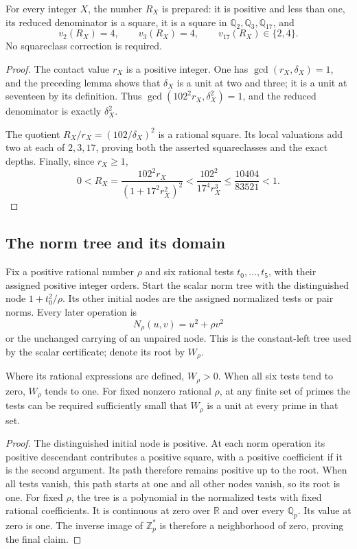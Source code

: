 \begin{proposition}\label{sn:prepared-constant}
For every integer $X$, the number $R_X$ is prepared: it is
positive and less than one, its reduced denominator is a square,
it is a square in $\mathbb Q_2,\mathbb Q_3,\mathbb Q_{17}$,
and
\[
 v_2(R_X)=4,\qquad v_3(R_X)=4,\qquad
 v_{17}(R_X)\in\{2,4\}.
\]
No squareclass correction is required.
\end{proposition}
\begin{proof}
The contact value $r_X$ is a positive integer.  One has
$\gcd(r_X,\delta_X)=1$, and the preceding lemma shows that
$\delta_X$ is a unit at two and three; it is a unit at
seventeen by its definition.  Thus
$\gcd(102^2r_X,\delta_X^2)=1$, and the reduced denominator
is exactly $\delta_X^2$.

The quotient $R_X/r_X=(102/\delta_X)^2$ is a rational square.
Its local valuations add two at each of $2,3,17$, proving
both the asserted squareclasses and the exact depths.  Finally,
since $r_X\ge1$,
\[
 0<R_X=
 \frac{102^2r_X}{(1+17^2r_X^2)^2}
 <\frac{102^2}{17^4r_X^3}
 \le\frac{10404}{83521}<1.
\]
\end{proof}

\subsection{The norm tree and its domain}

Fix a positive rational number $\rho$ and six rational tests
$t_0,\ldots,t_5$, with their assigned positive integer orders.
Start the scalar norm tree with the distinguished node
$1+t_0^2/\rho$.  Its other initial nodes are the assigned
normalized tests or pair norms.  Every later operation is
\[
                  N_\rho(u,v)=u^2+\rho v^2
\]
or the unchanged carrying of an unpaired node.  This is the
constant-left tree used by the scalar certificate; denote its
root by $W_\rho$.

\begin{lemma}\label{sn:positive-root}
Where its rational expressions are defined, $W_\rho>0$.
When all six tests tend to zero, $W_\rho$ tends to one.
For fixed nonzero rational $\rho$, at any finite set of primes
the tests can be required sufficiently small that
$W_\rho$ is a unit at every prime in that set.
\end{lemma}
\begin{proof}
The distinguished initial node is positive.  At each norm
operation its positive descendant contributes a positive
square, with a positive coefficient if it is the second
argument.  Its path therefore remains positive up to the
root.  When all tests vanish, this path starts at one and
all other nodes vanish, so its root is one.  For fixed
$\rho$, the tree is a polynomial in the normalized tests
with fixed rational coefficients.  It is continuous at zero
over $\mathbb R$ and over every $\mathbb Q_p$.
Its value at zero is one.  The inverse image of $\mathbb Z_p^*$
is therefore a neighborhood of zero, proving the final claim.
\end{proof}

